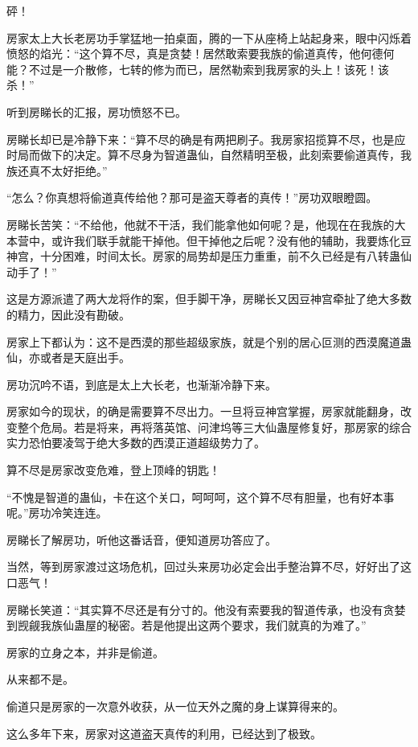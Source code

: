 
\begin{this_body}

砰！

房家太上大长老房功手掌猛地一拍桌面，腾的一下从座椅上站起身来，眼中闪烁着愤怒的焰光：“这个算不尽，真是贪婪！居然敢索要我族的偷道真传，他何德何能？不过是一介散修，七转的修为而已，居然勒索到我房家的头上！该死！该杀！”

听到房睇长的汇报，房功愤怒不已。

房睇长却已是冷静下来：“算不尽的确是有两把刷子。我房家招揽算不尽，也是应时局而做下的决定。算不尽身为智道蛊仙，自然精明至极，此刻索要偷道真传，我族还真不太好拒绝。”

“怎么？你真想将偷道真传给他？那可是盗天尊者的真传！”房功双眼瞪圆。

房睇长苦笑：“不给他，他就不干活，我们能拿他如何呢？是，他现在在我族的大本营中，或许我们联手就能干掉他。但干掉他之后呢？没有他的辅助，我要炼化豆神宫，十分困难，时间太长。房家的局势却是压力重重，前不久已经是有八转蛊仙动手了！”

这是方源派遣了两大龙将作的案，但手脚干净，房睇长又因豆神宫牵扯了绝大多数的精力，因此没有勘破。

房家上下都认为：这不是西漠的那些超级家族，就是个别的居心叵测的西漠魔道蛊仙，亦或者是天庭出手。

房功沉吟不语，到底是太上大长老，也渐渐冷静下来。

房家如今的现状，的确是需要算不尽出力。一旦将豆神宫掌握，房家就能翻身，改变整个危局。若是将来，再将落英馆、问津坞等三大仙蛊屋修复好，那房家的综合实力恐怕要凌驾于绝大多数的西漠正道超级势力了。

算不尽是房家改变危难，登上顶峰的钥匙！

“不愧是智道的蛊仙，卡在这个关口，呵呵呵，这个算不尽有胆量，也有好本事呢。”房功冷笑连连。

房睇长了解房功，听他这番话音，便知道房功答应了。

当然，等到房家渡过这场危机，回过头来房功必定会出手整治算不尽，好好出了这口恶气！

房睇长笑道：“其实算不尽还是有分寸的。他没有索要我的智道传承，也没有贪婪到觊觎我族仙蛊屋的秘密。若是他提出这两个要求，我们就真的为难了。”

房家的立身之本，并非是偷道。

从来都不是。

偷道只是房家的一次意外收获，从一位天外之魔的身上谋算得来的。

这么多年下来，房家对这道盗天真传的利用，已经达到了极致。


\end{this_body}
